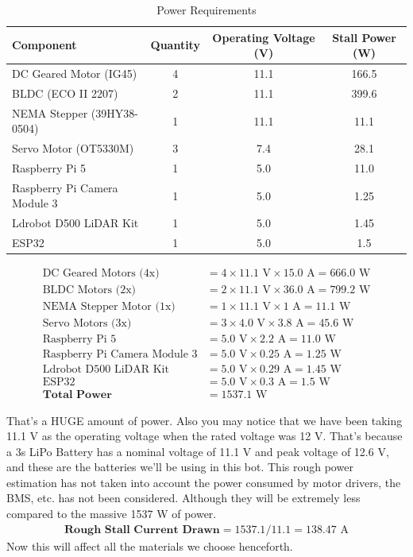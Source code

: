 \documentclass[12pt]{article}
\begin{document}
\begin{table}[h]
\centering
\begin{tabular}{|l|c|c|c|}
\hline
\textbf{Component} & \textbf{Quantity} & \textbf{Operating Voltage (V)} & \textbf{Stall Power (W)} \\
\hline
DC Geared Motor (IG45) & 4 & 11.1 & 166.5 \\
\hline
BLDC (ECO II 2207) & 2 & 11.1 & 399.6 \\
\hline
NEMA Stepper (39HY38-0504) & 1 & 11.1 & 11.1 \\
\hline
Servo Motor (OT5330M) & 3 & 7.4 & 28.1 \\
\hline
Raspberry Pi 5 & 1 & 5.0 & 11.0 \\
\hline
Raspberry Pi Camera Module 3 & 1 & 5.0 & 1.25 \\
\hline
Ldrobot D500 LiDAR Kit & 1 & 5.0 & 1.45 \\
\hline
ESP32 & 1 & 5.0 & 1.5 \\
\hline
\end{tabular}
\caption{Power Requirements}
\end{table}

\begin{align*}
\text{DC Geared Motors (4x)} &= 4 \times 11.1\text{ V} \times 15.0\text{ A} = 666.0\text{ W} \\
\text{BLDC Motors (2x)} &= 2 \times 11.1\text{ V} \times 36.0\text{ A} = 799.2\text{ W} \\
\text{NEMA Stepper Motor (1x)} &= 1 \times 11.1\text{ V} \times 1\text{ A} = 11.1\text{ W} \\
\text{Servo Motors (3x)} &= 3 \times 4.0\text{ V} \times 3.8\text{ A} = 45.6\text{ W} \\
\text{Raspberry Pi 5} &= 5.0\text{ V} \times 2.2\text{ A} = 11.0\text{ W} \\
\text{Raspberry Pi Camera Module 3} &= 5.0\text{ V} \times 0.25\text{ A} = 1.25\text{ W} \\
\text{Ldrobot D500 LiDAR Kit} &= 5.0\text{ V} \times 0.29\text{ A} = 1.45\text{ W} \\
\text{ESP32} &= 5.0\text{ V} \times 0.3\text{ A} = 1.5\text{ W} \\
\textbf{Total Power} &= 1537.1\text{ W}
\end{align*}

That's a HUGE amount of power. Also you may notice that we have been taking 11.1 V as the operating voltage when the rated voltage was 12 V. That's because a 3s LiPo Battery has a nominal voltage of 11.1 V and peak voltage of 12.6 V, and these are the batteries we'll be using in this bot.
\newline
This rough power estimation has not taken into account the power consumed by motor drivers, the BMS, etc. has not been considered. Although they will be extremely less compared to the massive 1537 W of power.
\begin{align*}
    \textbf{Rough Stall Current Drawn} = 1537.1/11.1 = 138.47\text{ A}
\end{align*}
Now this will affect all the materials we choose henceforth.
\end{document}
